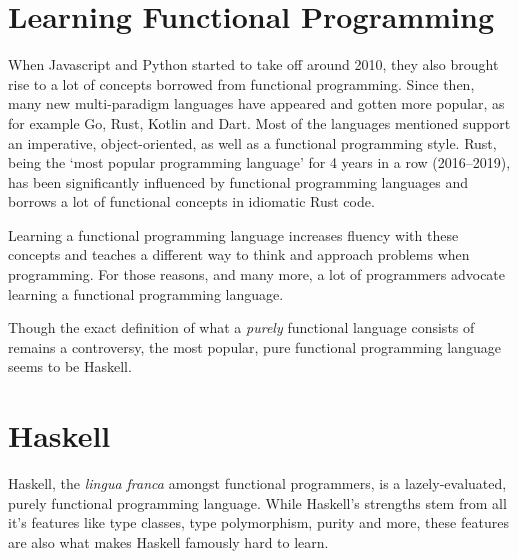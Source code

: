 
\section{Learning Functional Programming}
When Javascript and Python started to take off around 2010\autocite{python-popularity},
they also brought rise to a lot of concepts borrowed from functional programming.
Since then, many new multi-paradigm
languages have appeared and gotten more popular, as for example Go, Rust,
Kotlin and Dart.
Most of the languages mentioned support an imperative, object-oriented, as well as a functional programming style.
Rust, being the `most popular programming language'%
for 4 years in a row (2016--2019), has been
significantly influenced by functional programming languages\autocite{rust-functional} and borrows a lot of functional
concepts in idiomatic Rust code.

Learning a functional programming language increases fluency with these concepts and teaches a different
way to think and approach problems when programming. For those reasons, and many more, a lot of programmers
advocate learning a functional programming language.

Though the exact definition of what a \textit{purely} functional language consists of remains a controversy\autocite{functional-controversy},
the most popular, pure functional programming language seems to be Haskell\autocite{comparison-functional-languages}.

\section{Haskell}

Haskell, the \textit{lingua franca} amongst functional programmers, is a lazely-evaluated, purely functional programming
language. While Haskell's strengths stem from all it's features like type classes, type polymorphism, purity and more,
these features are also what makes Haskell famously hard to learn\autocite{haskell-hard-one}\autocite{haskell-hard-two}\autocite{haskell-hard-three}\autocite{haskell-hard-four}.

